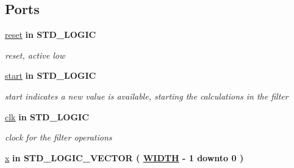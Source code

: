 \subsection*{Ports}
 \begin{DoxyCompactItemize}
\item 
\hypertarget{classdigitalfilter_aae5de5c5aebf7b54ecd36feaba217215}{\hyperlink{classdigitalfilter_aae5de5c5aebf7b54ecd36feaba217215}{reset}  {\bfseries {\bfseries \textcolor{vhdlkeyword}{in}\textcolor{vhdlchar}{ }}} {\bfseries \textcolor{comment}{S\-T\-D\-\_\-\-L\-O\-G\-I\-C}\textcolor{vhdlchar}{ }} }\label{classdigitalfilter_aae5de5c5aebf7b54ecd36feaba217215}

\begin{DoxyCompactList}\small\item\em reset, active low \end{DoxyCompactList}\item 
\hypertarget{classdigitalfilter_a4c6f5b721113d4ad96eb10f383e44e7a}{\hyperlink{classdigitalfilter_a4c6f5b721113d4ad96eb10f383e44e7a}{start}  {\bfseries {\bfseries \textcolor{vhdlkeyword}{in}\textcolor{vhdlchar}{ }}} {\bfseries \textcolor{comment}{S\-T\-D\-\_\-\-L\-O\-G\-I\-C}\textcolor{vhdlchar}{ }} }\label{classdigitalfilter_a4c6f5b721113d4ad96eb10f383e44e7a}

\begin{DoxyCompactList}\small\item\em start indicates a new value is available, starting the calculations in the filter \end{DoxyCompactList}\item 
\hypertarget{classdigitalfilter_a8120037e0ee47c35ba2d79242209c72e}{\hyperlink{classdigitalfilter_a8120037e0ee47c35ba2d79242209c72e}{clk}  {\bfseries {\bfseries \textcolor{vhdlkeyword}{in}\textcolor{vhdlchar}{ }}} {\bfseries \textcolor{comment}{S\-T\-D\-\_\-\-L\-O\-G\-I\-C}\textcolor{vhdlchar}{ }} }\label{classdigitalfilter_a8120037e0ee47c35ba2d79242209c72e}

\begin{DoxyCompactList}\small\item\em clock for the filter operations \end{DoxyCompactList}\item 
\hypertarget{classdigitalfilter_a8c5602ac7769fa0806595aa864d2134b}{\hyperlink{classdigitalfilter_a8c5602ac7769fa0806595aa864d2134b}{x}  {\bfseries {\bfseries \textcolor{vhdlkeyword}{in}\textcolor{vhdlchar}{ }}} {\bfseries \textcolor{comment}{S\-T\-D\-\_\-\-L\-O\-G\-I\-C\-\_\-\-V\-E\-C\-T\-O\-R}\textcolor{vhdlchar}{ }\textcolor{vhdlchar}{(}\textcolor{vhdlchar}{ }\textcolor{vhdlchar}{ }{\bfseries \hyperlink{classdigitalfilter_a91fcbc2cb8dd91f914c30526e23794a9}{W\-I\-D\-T\-H}} \textcolor{vhdlchar}{ }\textcolor{vhdlchar}{-\/}\textcolor{vhdlchar}{ } \textcolor{vhdldigit}{1} \textcolor{vhdlchar}{ }\textcolor{vhdlchar}{ }\textcolor{vhdlchar}{ }\textcolor{vhdlkeyword}{downto}\textcolor{vhdlchar}{ }\textcolor{vhdlchar}{ }\textcolor{vhdlchar}{ } \textcolor{vhdldigit}{0} \textcolor{vhdlchar}{ }\textcolor{vhdlchar}{)}\textcolor{vhdlchar}{ }} }\label{classdigitalfilter_a8c5602ac7769fa0806595aa864d2134b}


\end{DoxyCompactItemize}
